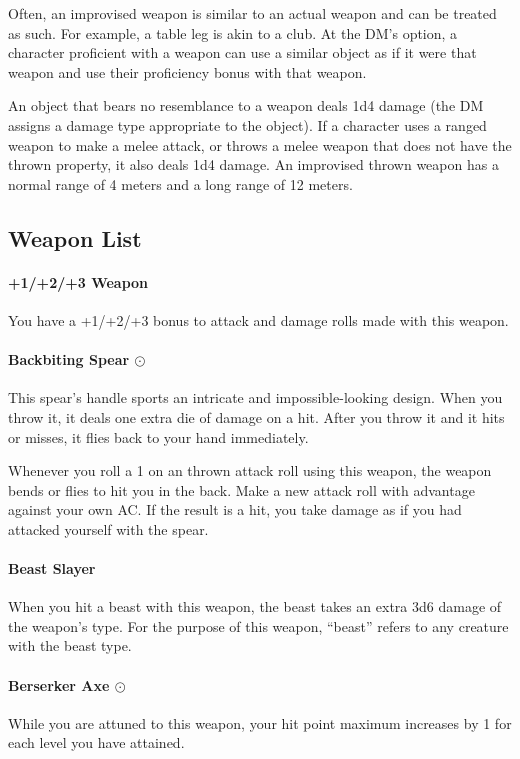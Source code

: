     Often, an improvised weapon is similar to an actual weapon and can be treated as such.
    For example, a table leg is akin to a club.
    At the DM's option, a character proficient with a weapon can use a similar object as if it were that weapon and use their proficiency bonus with that weapon.

    An object that bears no resemblance to a weapon deals 1d4 damage (the DM assigns a damage type appropriate to the object).
    If a character uses a ranged weapon to make a melee attack, or throws a melee weapon that does not have the thrown property, it also deals 1d4 damage.
    An improvised thrown weapon has a normal range of 4 meters and a long range of 12 meters.
\subsection*{Weapon List} \label{ssec::weaponlist}
    \paragraph{+1/+2/+3 Weapon}
        You have a +1/+2/+3 bonus to attack and damage rolls made with this weapon.
    \paragraph{Backbiting Spear $\odot$}
        This spear's handle sports an intricate and impossible-looking design.
        When you throw it, it deals one extra die of damage on a hit.
        After you throw it and it hits or misses, it flies back to your hand immediately.

        Whenever you roll a 1 on an thrown attack roll using this weapon, the weapon bends or flies to hit you in the back.
        Make a new attack roll with advantage against your own AC.
        If the result is a hit, you take damage as if you had attacked yourself with the spear.
    \paragraph{Beast Slayer}
        When you hit a beast with this weapon, the beast takes an extra 3d6 damage of the weapon's type.
        For the purpose of this weapon, ``beast'' refers to any creature with the beast type.
    \paragraph{Berserker Axe $\odot$}
        While you are attuned to this weapon, your hit point maximum increases by 1 for each level you have attained.

